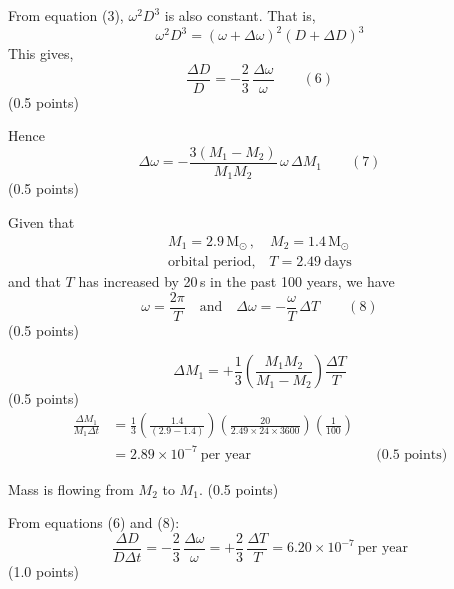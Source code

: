 \begin{description}
From equation (3), $\omega^2 D^3$ is also constant. That is,
\[ \omega^2 D^3 = (\omega + \Delta\omega)^2 (D + \Delta D)^3 \]
This gives,
\[ \frac{\Delta D}{D} = -\frac{2}{3}\,\frac{\Delta\omega}{\omega}
   \qquad (6) \]
\hfill(0.5 points)

Hence
\[ \Delta\omega = -\frac{3\left(M_1 - M_2\right)}{M_1 M_2}\,
   \omega\,\Delta M_1 \qquad (7) \]
\hfill(0.5 points)

\item[d)] Given that
\begin{gather*}
M_1 = 2.9\,\mathrm{M}_\odot\,, \quad M_2 = 1.4\,\mathrm{M}_\odot \\
\text{orbital period,}\quad T = 2.49\ \text{days}
\end{gather*}
and that $T$ has increased by 20\,s in the past 100 years, we have
\[ \omega = \frac{2\pi}{T} \quad\text{and}\quad
   \Delta\omega = -\frac{\omega}{T}\,\Delta T \qquad (8) \]
\hfill(0.5 points)

\[ \Delta M_1 = +\frac{1}{3}\left(\frac{M_1 M_2}{M_1 - M_2}\right)
   \frac{\Delta T}{T} \]
\hfill(0.5 points)
\begin{align*}
\frac{\Delta M_1}{M_1 \Delta t}
  &= \frac{1}{3}\left(\frac{1.4}{(2.9 - 1.4)}\right)
     \left(\frac{20}{2.49 \times 24 \times 3600}\right)
     \left(\frac{1}{100}\right) \\
  &= 2.89 \times 10^{-7}\ \text{per year}
  && \text{(0.5 points)}
\end{align*}

\item[e)] Mass is flowing from $M_2$ to $M_1$. \hfill(0.5 points)

\item[f)] From equations (6) and (8):
\[ \frac{\Delta D}{D\Delta t} = -\frac{2}{3}\,\frac{\Delta\omega}{\omega}
   = +\frac{2}{3}\,\frac{\Delta T}{T}
   = 6.20 \times 10^{-7}\ \text{per year} \]
\hfill(1.0 points)
\end{description}
